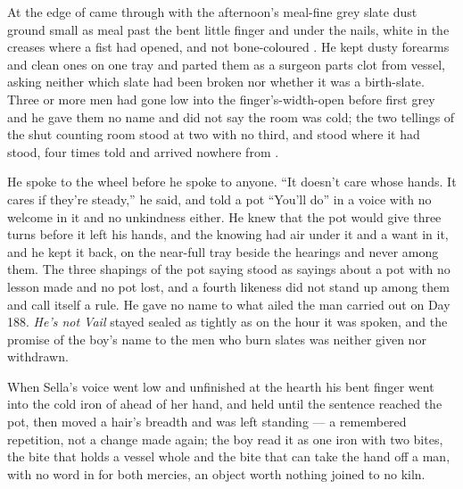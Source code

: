 At the edge of   came through with the afternoon's meal-fine grey slate dust ground small as meal past the bent little finger and under the nails, white in the creases where a fist had opened, and not bone-coloured . He kept dusty forearms and clean ones on one tray and parted them as a surgeon parts clot from vessel, asking neither which slate had been broken nor whether it was a birth-slate. Three or more men had gone low into the finger's-width-open  before first grey and he gave them no name and did not say the room was cold; the two tellings of the shut counting room stood at two with no third, and  stood where it had stood, four times told and arrived nowhere from .

He spoke to the wheel before he spoke to anyone. “It doesn't care whose hands. It cares if they're steady,” he said, and told a pot “You'll do” in a voice with no welcome in it and no unkindness either. He knew  that the pot would give three turns before it left his hands, and the knowing had air under it and a want in it, and he kept it back, on the near-full tray beside the hearings and never among them. The three shapings of the pot saying stood as sayings about a pot with no lesson made and no pot lost, and a fourth likeness did not stand up among them and call itself a rule. He gave no name to what ailed the man carried out on Day 188. \emph{He's not Vail} stayed sealed as tightly as on the hour it was spoken, and the promise of the boy's name to the men who burn slates was neither given nor withdrawn.

When Sella's voice went low and unfinished at the hearth his bent finger went into the cold iron of  ahead of her hand, and held until the sentence reached the pot, then moved a hair's breadth and was left standing --- a remembered repetition, not a change made again; the boy read it as one iron with two bites, the bite that holds a vessel whole and the bite that can take the hand off a man, with no word in  for both mercies, an object worth nothing joined to no kiln.

\scenebreak


